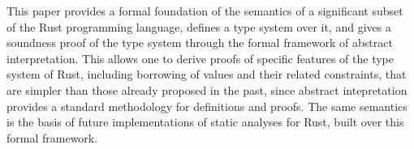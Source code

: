 This paper provides a formal foundation of the semantics of
a significant subset of the Rust programming
language, defines a type system over it, and gives a soundness proof
of the type system through the formal framework of abstract interpretation.
This allows one to derive proofs of specific features of the
type system of Rust, including borrowing of values and their related
constraints, that are simpler than those already proposed in the past,
since abstract intepretation provides a standard
methodology for definitions and proofs.
The same semantics is the basis of future implementations of static analyses
for Rust, built over this formal framework.
